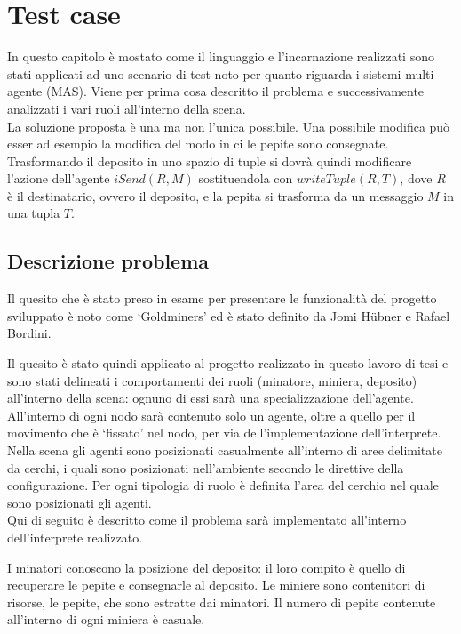 \chapter{Test case}
In questo capitolo è mostato come il linguaggio e l'incarnazione realizzati sono stati applicati ad uno scenario di test noto per quanto riguarda i sistemi multi agente (MAS).
Viene per prima cosa descritto il problema e successivamente analizzati i vari ruoli all'interno della scena.
\\
La soluzione proposta è una ma non l'unica possibile. Una possibile modifica può esser ad esempio la modifica del modo in ci le pepite sono consegnate. Trasformando il deposito in uno spazio di tuple si dovrà quindi modificare l'azione dell'agente $iSend(R,M)$ sostituendola con $writeTuple(R,T)$, dove $R$ è il destinatario, ovvero il deposito, e la pepita si trasforma da un messaggio $M$ in una tupla $T$. 

\section{Descrizione problema}
Il quesito che è stato preso in esame per presentare le funzionalità del progetto sviluppato è noto come `Goldminers' ed è stato definito da Jomi H\"ubner e Rafael Bordini.

\medskip
{}
\medskip

Il quesito è stato quindi applicato al progetto realizzato in questo lavoro di tesi e sono stati delineati i comportamenti dei ruoli (minatore, miniera, deposito) all'interno della scena: ognuno di essi sarà una specializzazione dell'agente. All'interno di ogni nodo sarà contenuto solo un agente, oltre a quello per il movimento che è `fissato' nel nodo, per via dell'implementazione dell'interprete.
\\
Nella scena gli agenti sono posizionati casualmente all'interno di aree delimitate da cerchi, i quali sono posizionati nell'ambiente secondo le direttive della configurazione. Per ogni tipologia di ruolo è definita l'area del cerchio nel quale sono posizionati gli agenti.
\\
Qui di seguito è descritto come il problema sarà implementato all'interno dell'interprete realizzato.

I minatori conoscono la posizione del deposito: il loro compito è quello di recuperare le pepite e consegnarle al deposito.
Le miniere sono contenitori di risorse, le pepite, che sono estratte dai minatori. Il numero di pepite contenute all'interno di ogni miniera è casuale.

